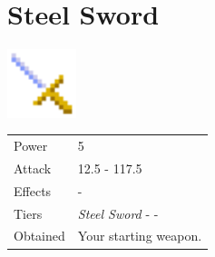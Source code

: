 \section{Steel Sword}
\label{weapon:steel_sword}

\includegraphics[height=2cm,keepaspectratio]{./resources/weapons/steelsword}

\begin{longtable}{ l p{9cm} }
	Power
	& 5
\\ %
	Attack
	& 12.5 - 117.5
\\ %
	Effects
	& -
\\ %
	Tiers
	& \textit{Steel Sword} - \nameref{weapon:knights_sword} - \nameref{weapon:excalibur}
\\ %
	Obtained
	& Your starting weapon.
\end{longtable}
